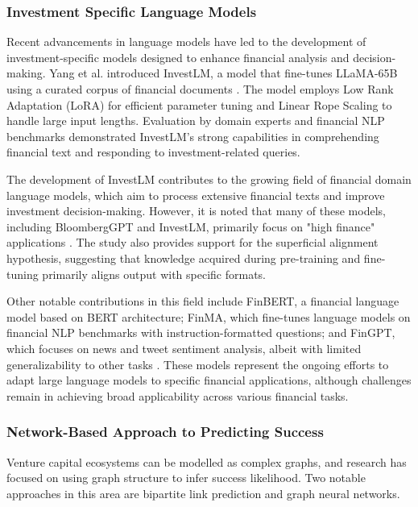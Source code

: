 \documentclass[a4paper, oneside]{discothesis}
\begin{document}
\subsubsection{Investment Specific Language Models}
Recent advancements in language models have led to the development of investment-specific models designed to enhance financial analysis and decision-making. Yang et al. introduced InvestLM, a model that fine-tunes LLaMA-65B using a curated corpus of financial documents \cite{yang2023investlm}. The model employs Low Rank Adaptation (LoRA) for efficient parameter tuning and Linear Rope Scaling to handle large input lengths. Evaluation by domain experts and financial NLP benchmarks demonstrated InvestLM's strong capabilities in comprehending financial text and responding to investment-related queries.

The development of InvestLM contributes to the growing field of financial domain language models, which aim to process extensive financial texts and improve investment decision-making. However, it is noted that many of these models, including BloombergGPT and InvestLM, primarily focus on "high finance" applications \cite{yang2023investlm}. The study also provides support for the superficial alignment hypothesis, suggesting that knowledge acquired during pre-training and fine-tuning primarily aligns output with specific formats.

Other notable contributions in this field include FinBERT, a financial language model based on BERT architecture; FinMA, which fine-tunes language models on financial NLP benchmarks with instruction-formatted questions; and FinGPT, which focuses on news and tweet sentiment analysis, albeit with limited generalizability to other tasks \cite{araci2019finbert, liu2023finma, yang2023fingpt}. These models represent the ongoing efforts to adapt large language models to specific financial applications, although challenges remain in achieving broad applicability across various financial tasks.

\subsubsection{Network-Based Approach to Predicting Success}

Venture capital ecosystems can be modelled as complex graphs, and research has focused on using graph structure to infer success likelihood. Two notable approaches in this area are bipartite link prediction and graph neural networks.
\end{document}
